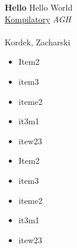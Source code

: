 \documentclass[12pt]{article}
\begin{document}
\textbf{Hello}
Hello World
\\
\underline{Kompilatory}
\textit{AGH}
\\
\\
Kordek, Zacharski
\\
\begin{itemize}
    \item Item2
    \item item3
    \item iteme2
    \item it3m1
    \item itew23
    \item Item2
    \item item3
    \item iteme2
    \item it3m1
    \item itew23
\end{itemize}
\end{document}
